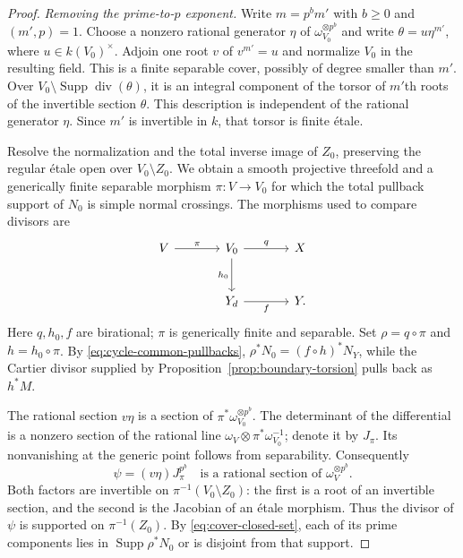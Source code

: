 \begin{proof}
\emph{Removing the prime-to-$p$ exponent.}
Write $m=p^b m'$ with $b\geq0$ and $(m',p)=1$.  Choose a nonzero
rational generator $\eta$ of $\omega_{V_0}^{\otimes p^b}$ and write
$\theta=u\eta^{m'}$, where $u\in k(V_0)^\times$.  Adjoin one root
$v$ of $v^{m'}=u$ and normalize $V_0$ in the resulting field.
This is a finite separable cover, possibly of degree smaller than
$m'$.  Over $V_0\setminus\operatorname{Supp}\operatorname{div}(\theta)$,
it is an integral component of the torsor of $m'$th roots of the
invertible section $\theta$.  This description is independent of the
rational generator $\eta$.  Since $m'$ is invertible in $k$, that
torsor is finite \'etale.

Resolve the normalization and the total inverse image of $Z_0$,
preserving the regular \'etale open over $V_0\setminus Z_0$.  We
obtain a smooth projective threefold and a generically finite
separable morphism
$\pi:V\to V_0$ for which the total pullback support of $N_0$ is
simple normal crossings.  The morphisms used to compare divisors are
\[
\begin{tikzcd}[column sep=large,row sep=large]
 V\arrow[r,"\pi"] &V_0\arrow[r,"q"]\arrow[d,"h_0"']&X\\
 &Y_d\arrow[r,"f"']&Y.
\end{tikzcd}
\]
Here $q,h_0,f$ are birational; $\pi$ is generically finite and
separable.  Set $\rho=q\circ\pi$ and $h=h_0\circ\pi$.  By
\eqref{eq:cycle-common-pullbacks}, $\rho^*N_0=(f\circ h)^*N_Y$,
while the Cartier divisor supplied by
Proposition~\ref{prop:boundary-torsion} pulls back as $h^*M$.

The rational section $v\eta$ is a section of
$\pi^*\omega_{V_0}^{\otimes p^b}$.  The determinant of the
differential is a nonzero section of the rational line
$\omega_V\otimes\pi^*\omega_{V_0}^{-1}$; denote it by $J_\pi$.
Its nonvanishing at the generic point follows from separability.
Consequently
\begin{equation}\label{eq:canonical-root-section}
 \psi=(v\eta)J_\pi^{p^b}
       \quad\text{is a rational section of }
                \omega_V^{\otimes p^b}.
\end{equation}
Both factors are invertible on $\pi^{-1}(V_0\setminus Z_0)$: the first is
a root of an invertible section, and the second is the Jacobian of
an \'etale morphism.  Thus the divisor of $\psi$ is supported on
$\pi^{-1}(Z_0)$.  By \eqref{eq:cover-closed-set}, each of its prime
components lies in $\operatorname{Supp}\rho^*N_0$ or is disjoint
from that support.


\end{proof}
